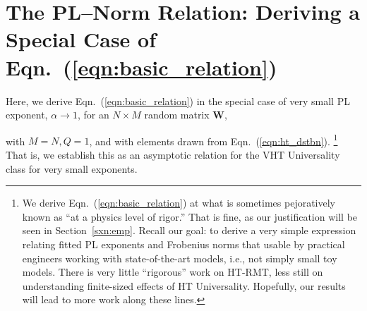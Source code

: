 

\newpage


\section{The PL--Norm Relation: Deriving a Special Case of Eqn.~(\ref{eqn:basic_relation})}
\label{sxn:appendix-derivation-pl-norm-relation}

Here, we derive Eqn.~(\ref{eqn:basic_relation}) in the special case of very small PL exponent, $\alpha \rightarrow 1$, for an $N \times M$ random matrix $\mathbf{W}$, {with $M=N, Q=1$, and with elements drawn from Eqn.~(\ref{eqn:ht_dstbn}).%
\footnote{We derive Eqn.~(\ref{eqn:basic_relation}) at what is sometimes pejoratively known as ``at a physics level of rigor.''  That is fine, as our justification will be seen in Section~\ref{sxn:emp}.  Recall our goal: to derive a very simple expression relating fitted PL exponents and Frobenius norms that usable by practical engineers working with state-of-the-art models, i.e., not simply small toy models.  There is very little ``rigorous'' work on HT-RMT, less still on understanding finite-sized effects of HT Universality.  Hopefully, our results will lead to more work along these lines.  }
That is, we establish this as an asymptotic relation for the VHT Universality class for very small exponents.

}
